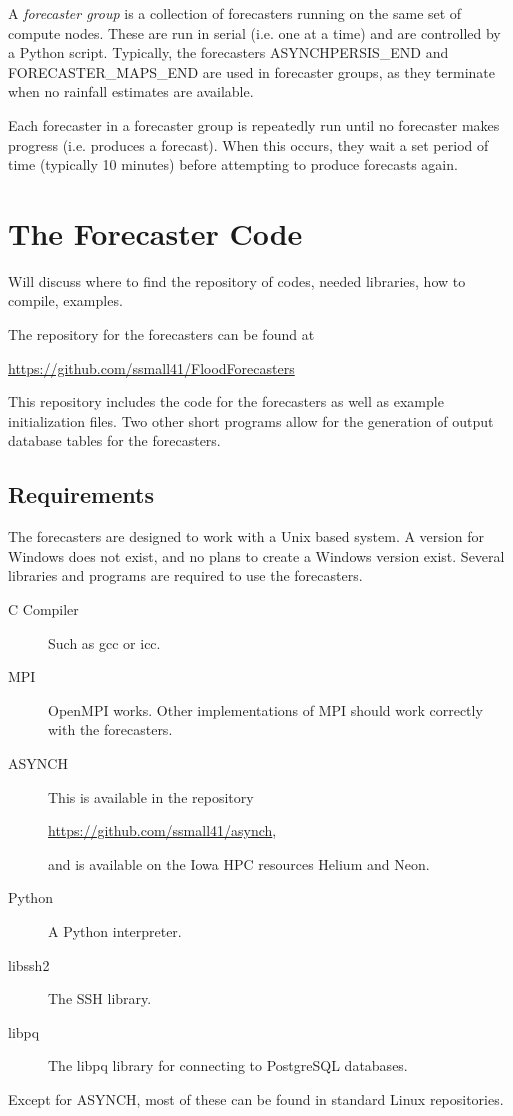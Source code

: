 \documentclass[12pt]{article}
\begin{document}
A \emph{forecaster group} is a collection of forecasters running on the same set of compute nodes. These are run in serial (i.e. one at a time) and are controlled by a Python script. Typically, the forecasters ASYNCHPERSIS\_END and FORECASTER\_MAPS\_END are used in forecaster groups, as they terminate when no rainfall estimates are available.

Each forecaster in a forecaster group is repeatedly run until no forecaster makes progress (i.e. produces a forecast). When this occurs, they wait a set period of time (typically 10 minutes) before attempting to produce forecasts again.


\section{The Forecaster Code} \label{sec: forecaster code}

Will discuss where to find the repository of codes, needed libraries, how to compile, examples.

The repository for the forecasters can be found at
\begin{center}
\url{https://github.com/ssmall41/FloodForecasters}
\end{center}
This repository includes the code for the forecasters as well as example initialization files. Two other short programs allow for the generation of output database tables for the forecasters.

\subsection{Requirements} \label{sec: requirements}

The forecasters are designed to work with a Unix based system. A version for Windows does not exist, and no plans to create a Windows version exist. Several libraries and programs are required to use the forecasters.
\begin{description}
 \item[C Compiler] Such as gcc or icc.
 \item[MPI] OpenMPI works. Other implementations of MPI should work correctly with the forecasters.
 \item[ASYNCH] This is available in the repository
 \begin{center}
 \url{https://github.com/ssmall41/asynch},
 \end{center}
 and is available on the Iowa HPC resources Helium and Neon.
 \item[Python] A Python interpreter.
 \item[libssh2] The SSH library.
 \item[libpq] The libpq library for connecting to PostgreSQL databases.
\end{description}
Except for ASYNCH, most of these can be found in standard Linux repositories.
\end{document}
